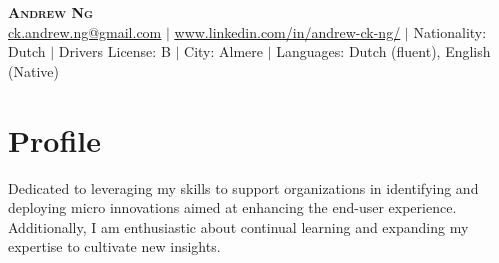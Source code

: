 \documentclass[letterpaper,11pt]{article}
\begin{document}

\begin{center}
    \textbf{\Huge \scshape Andrew Ng} \\ \vspace{1pt}
    \href{mailto:x@x.com}{\underline{ck.andrew.ng@gmail.com}} $|$ 
    \href{https://linkedin.com/in/...}{\underline{www.linkedin.com/in/andrew-ck-ng/}} $|$
    \small Nationality: Dutch $|$ 
    {\small{Drivers License: B}} $|$  {\small{City: Almere}} $|$  
    {\small{Languages: Dutch (fluent), English (Native) }}
\end{center}

\section{Profile}
{\small{Dedicated to leveraging my skills to support organizations in identifying and deploying micro innovations aimed at enhancing the end-user experience. Additionally, I am enthusiastic about continual learning and expanding my expertise to cultivate new insights.}}

\vspace{0.5cm}
\end{document}
